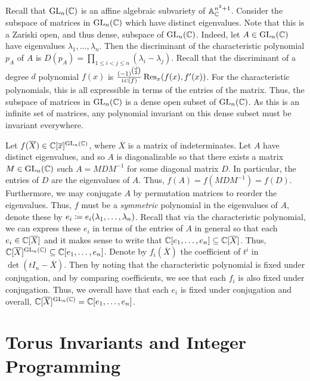 \documentclass[letterpaper, 11pt, oneside]{book}
\begin{document}
\begin{sol}
  Recall that $\operatorname{GL}_{n}(\mathbb{C})$ is an affine algebraic subvariety of $\mathbb{A}_{\mathbb{C}}^{n^{2} + 1}$.
  Consider the subspace of matrices in $\operatorname{GL}_{n}(\mathbb{C})$ which have distinct eigenvalues.
  Note that this is a Zariski open, and thus dense, subspace of $\operatorname{GL}_{n}(\mathbb{C})$.
  Indeed, let $A \in \operatorname{GL}_{n}(\mathbb{C})$ have eigenvalues $\lambda_{1}, \ldots, \lambda_{n}$.
  Then the discriminant of the characteristic polynomial $p_{A}$ of $A$ is $D(p_{A}) = \prod_{1 \leq i < j \leq n} (\lambda_{i} - \lambda_{j})$.
  Recall that the discriminant of a degree $d$ polynomial $f(x)$ is $\frac{(-1)^{\binom{d}{2}}}{\lc(f)} \Res_{x}(f(x), f'(x))$.
  For the characteristic polynomials, this is all expressible in terms of the entries of the matrix.
  Thus, the subspace of matrices in $\operatorname{GL}_{n}(\mathbb{C})$ is a dense open subset of $\operatorname{GL}_{n}(\mathbb{C})$.
  As this is an infinite set of matrices, any polynomial invariant on this dense subset must be invariant everywhere.

  Let $f(\overline{X}) \in \mathbb{C}[\overline{x}]^{\operatorname{GL}_{n}(\mathbb{C})}$, where $\overline{X}$ is a matrix of indeterminates.
  Let $A$ have distinct eigenvalues, and so $A$ is diagonalizable so that there exists a matrix $M \in \operatorname{GL}_{n}(\mathbb{C})$ such $A = MDM^{-1}$ for some diagonal matrix $D$.
  In particular, the entries of $D$ are the eigenvalues of $A$.
  Thus, $f(A) = f(MDM^{-1}) = f(D)$.
  Furthermore, we may conjugate $A$ by permutation matrices to reorder the eigenvalues.
  Thus, $f$ must be a \emph{symmetric} polynomial in the eigenvalues of $A$, denote these by $e_{i} \coloneqq e_{i}(\lambda_{1}, \ldots, \lambda_{n})$.
  Recall that via the characteristic polynomial, we can express these $e_{i}$ in terms of the entries of $A$ in general so that each $e_{i} \in \mathbb{C}[\overline{X}]$ and it makes sense to write that $\mathbb{C}[e_{1}, \ldots, e_{n}] \subseteq \mathbb{C}[\overline{X}]$.
  Thus, $\mathbb{C}[\overline{X}]^{\operatorname{GL}_{n}(\mathbb{C})} \subseteq \mathbb{C}[e_{1}, \ldots, e_{n}]$.
  Denote by $f_{i}(\overline{X})$ the coefficient of $t^{i}$ in $\det(tI_{n} - \overline{X})$.
  Then by noting that the characteristic polynomial is fixed under conjugation, and by comparing coefficients, we see that each $f_{i}$ is also fixed under conjugation.
  Thus, we overall have that each $e_{i}$ is fixed under conjugation and overall, $\mathbb{C}[\overline{X}]^{\operatorname{GL}_{n}(\mathbb{C})} = \mathbb{C}[e_{1}, \ldots, e_{n}]$.
\end{sol}

\clearpage

\section{Torus Invariants and Integer Programming}
\end{document}
